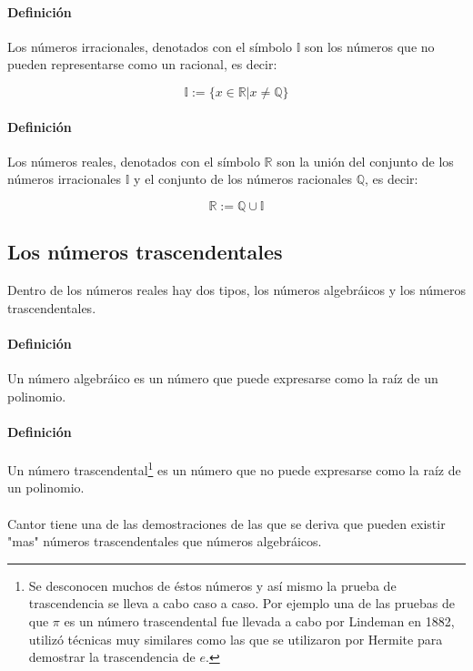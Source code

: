 \documentclass{article}
\begin{document}
\paragraph{Definición} Los números irracionales, denotados con el símbolo $\mathbb{I}$ son los números que no pueden representarse como un racional, es decir:

$$\mathbb{I} := \{x \in \mathbb{R} | x \neq \mathbb{Q} \}$$

\paragraph{Definición} Los números reales, denotados con el símbolo $\mathbb{R}$ son la unión del conjunto de los números irracionales $\mathbb{I}$ y el conjunto de los números racionales $\mathbb{Q}$, es decir:

$$\mathbb{R} := \mathbb{Q} \cup \mathbb{I} $$

\subsection{Los números trascendentales}

Dentro de los números reales hay dos tipos, los números algebráicos y los números trascendentales.

\paragraph{Definición} Un número algebráico es un número que puede expresarse como la raíz de un polinomio.

\paragraph{Definición} Un número trascendental\footnote{Se desconocen muchos de éstos números y así mismo la prueba de trascendencia se lleva a cabo caso a caso. Por ejemplo una de las pruebas de que $\pi$ es un número trascendental fue llevada a cabo por Lindeman en 1882, utilizó técnicas muy similares como las que se utilizaron por Hermite para demostrar la trascendencia de $e$.} es un número que no puede expresarse como la raíz de un polinomio.


\paragraph{}
Cantor tiene una de las demostraciones de las que se deriva que pueden existir "mas" números trascendentales que números algebráicos\cite{niven_1961}.
\end{document}
